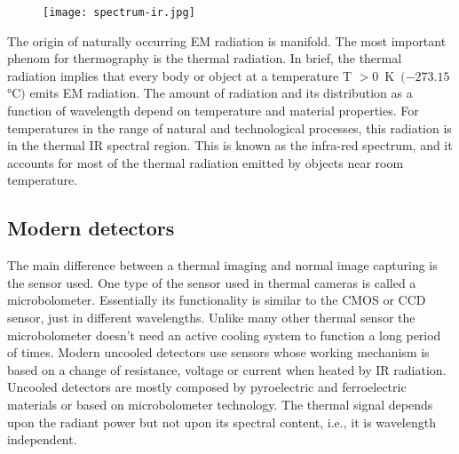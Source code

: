 %
%
\begin{figure}[!h]
	\centering
	\texttt{[image: spectrum-ir.jpg]}
	\label{fig:spectrum-ir}
\end{figure}
% 
\newline The origin of naturally occurring EM radiation is manifold. 
The most important phenom for thermography is the thermal radiation. 
In brief, the thermal radiation implies that every body or object at a
temperature T $>0 \,$ \si{\kelvin} $\,(-273.15 \,$\si{\celsius}$)$ emits EM
radiation. 
The amount of radiation and its distribution as a function of wavelength depend
on temperature and material properties.\cite{vollmer2017infrared}
For temperatures in the range of natural and technological processes, this 
radiation is in the thermal IR spectral region. 
This is known as the infra-red spectrum, and it accounts for most of the
thermal radiation emitted by objects near room temperature.
%
\subsection{Modern detectors}
\label{ssec:modern-detect}
The main difference between a thermal imaging and normal image capturing is the
sensor used. One type of the sensor used in thermal cameras is called a
microbolometer. Essentially its functionality is similar to the CMOS or CCD
sensor, just in different wavelengths. Unlike many other thermal sensor the
microbolometer doesn't need an active cooling system to function a long period
of times. Modern uncooled detectors use sensors whose working mechanism is based
on a change of resistance, voltage or current when heated by IR radiation.
Uncooled detectors are mostly composed by pyroelectric and ferroelectric
materials or based on microbolometer technology. The thermal signal depends upon
the radiant power but not upon its spectral content, i.e., it is wavelength
independent.\cite{10.1117/12.2266142,rogalski2000infrared}

